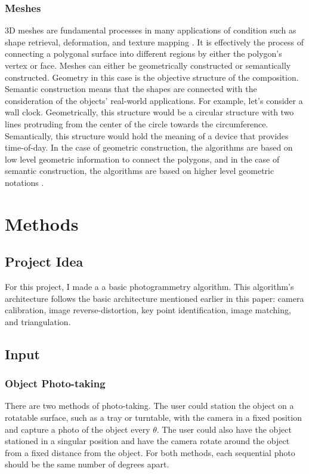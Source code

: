 \documentclass[10pt,twocolumn]{article}
\begin{document}
\subsubsection{Meshes}
3D meshes are fundamental processes in many applications of condition such as shape retrieval, deformation, and texture mapping \cite{benhabiles2010comparative}. It is effectively the process of connecting a polygonal surface into different regions by either the polygon’s vertex or face. Meshes can either be geometrically constructed or semantically constructed. Geometry in this case is the objective structure of the composition. Semantic construction means that the shapes are connected with the consideration of the objects' real-world applications. For example, let’s consider a wall clock. Geometrically, this structure would be a circular structure with two lines protruding from the center of the circle towards the circumference. Semantically, this structure would hold the meaning of a device that provides time-of-day. In the case of geometric construction, the algorithms are based on low level geometric information to connect the polygons, and in the case of semantic construction, the algorithms are based on higher level geometric notations \cite{lavoue2005new}.


\section{Methods}
\subsection{Project Idea}
For this project, I made a a basic photogrammetry algorithm. This algorithm's architecture follows the basic architecture mentioned earlier in this paper: camera calibration, image reverse-distortion, key point identification, image matching, and triangulation. 
\subsection{Input}
\subsubsection{Object Photo-taking}
There are two methods of photo-taking. The user could station the object on a rotatable surface, such as a tray or turntable, with the camera in a fixed position and capture a photo of the object every \begin{math}\theta\end{math}. The user could also have the object stationed in a singular position and have the camera rotate around the object from a fixed distance from the object. For both methods, each sequential photo should be the same number of degrees apart. 
\end{document}
